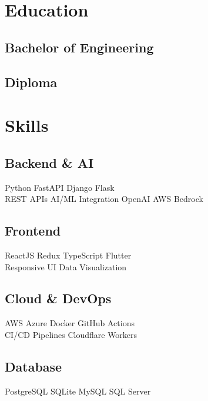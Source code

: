 \documentclass[]{deedy-resume-reversed}
\begin{document}
\begin{minipage}[t]{0.33\textwidth}

\section{Education}

\subsection{Bachelor of Engineering}
\sectionsep

\subsection{Diploma}
\sectionsep

\section{Skills}

\subsection{Backend \& AI}
Python \textbullet FastAPI \textbullet Django \textbullet Flask \\
REST APIs \textbullet AI/ML Integration \textbullet OpenAI \textbullet AWS Bedrock \\
\sectionsep

\subsection{Frontend}
ReactJS \textbullet Redux \textbullet TypeScript \textbullet Flutter \\
Responsive UI \textbullet Data Visualization \\
\sectionsep

\subsection{Cloud \& DevOps}
AWS \textbullet Azure \textbullet Docker \textbullet GitHub Actions \\
CI/CD Pipelines \textbullet Cloudflare Workers \\
\sectionsep

\subsection{Database}
PostgreSQL \textbullet SQLite \textbullet MySQL \textbullet SQL Server \\
\sectionsep


\end{minipage}
\end{document}
